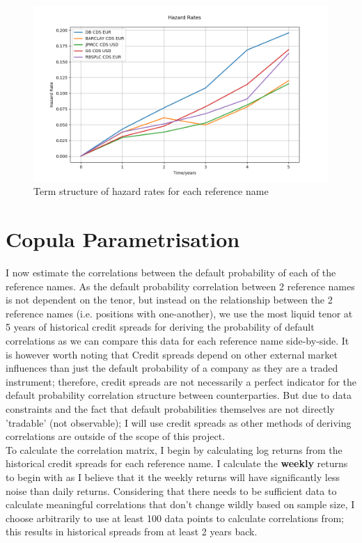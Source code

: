 \documentclass{report}
\theoremstyle{plain}
\theoremstyle{definition}
\begin{document}
\begin{figure}[H]
	\begin{center}
		\includegraphics[width=15cm]{Hazard_Rates.png}
		\caption{Term structure of hazard rates for each reference name} 
		\label{Hazard_Rates}
	\end{center}
\end{figure}

\chapter{Copula Parametrisation}

I now estimate the correlations between the default probability of each of the reference names. As the default probability correlation between 2 reference names is not dependent on the tenor, but instead on the relationship between the 2 reference names (i.e. positions with one-another), we use the most liquid tenor at 5 years of historical credit spreads for deriving the probability of default correlations as we can compare this data for each reference name side-by-side. It is however worth noting that Credit spreads depend on other external market influences than just the default probability of a company as they are a traded instrument; therefore, credit spreads are not necessarily a perfect indicator for the default probability correlation structure between counterparties. But due to data constraints and the fact that default probabilities themselves are not directly 'tradable' (not observable); I will use credit spreads as other methods of deriving correlations are outside of the scope of this project.\\

To calculate the correlation matrix, I begin by calculating log returns from the historical credit spreads for each reference name. I calculate the \textbf{weekly} returns to begin with as I believe that it the weekly returns will have significantly less noise than daily returns. Considering that there needs to be sufficient data to calculate meaningful correlations that don't change wildly based on sample size, I choose arbitrarily to use at least 100 data points to calculate correlations from; this results in historical spreads from at least 2 years back. 
\end{document}
